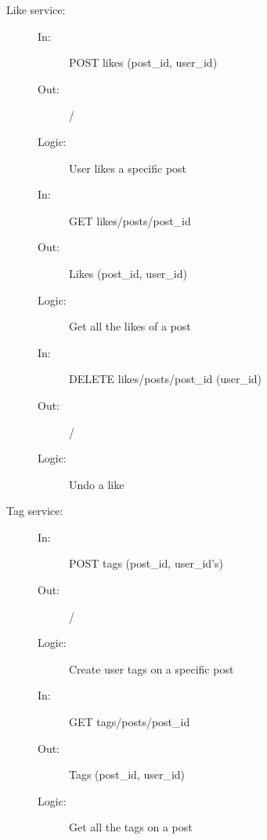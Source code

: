 \documentclass{article}
\begin{document}
\begin{description}
    \item [Like service:]
    \begin{description}
        \item[]
        \item[In:] POST likes (post\_id, user\_id)
        \item[Out:] /
        \item[Logic:] User likes a specific post
        \item[]

        \item[In:] GET likes/posts/post\_id
        \item[Out:] Likes (post\_id, user\_id)
        \item[Logic:] Get all the likes of a post
        \item[]
        
        \item[In:] DELETE likes/posts/post\_id (user\_id)
        \item[Out:] /
        \item[Logic:] Undo a like
    \end{description}
\end{description}

\begin{description}
    \item [Tag service:]
    \begin{description}
        \item[]
        \item[In:] POST tags (post\_id, user\_id's)
        \item[Out:] /
        \item[Logic:] Create user tags on a specific post
        \item[]

        \item[In:] GET tags/posts/post\_id
        \item[Out:] Tags (post\_id, user\_id)
        \item[Logic:] Get all the tags on a post
        \item[]
    \end{description}
\end{description}
\end{document}
